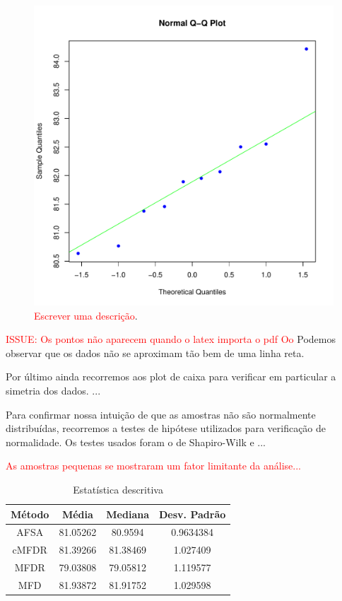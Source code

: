 \documentclass[conference]{IEEEtran}
\begin{document}
\begin{figure}[h]
	\centering
	\includegraphics[width=\linewidth]{img/bluenorm_mfd.pdf}
	\caption{\textcolor{red}{Escrever uma descrição}.}
	\label{fig:hist_mfd}
\end{figure}

\textcolor{red}{ISSUE: Os pontos não aparecem quando o latex importa o pdf Oo}
Podemos observar que os dados não se aproximam tão bem de uma linha reta.

Por último ainda recorremos aos plot de caixa para verificar em particular a simetria dos dados. ...

Para confirmar nossa intuição de que as amostras não são normalmente distribuídas, recorremos a testes de hipótese utilizados para verificação de normalidade.
Os testes usados foram o de Shapiro-Wilk \cite{shapiro1965analysis} e ...	

\textcolor{red}{As amostras pequenas se mostraram um fator limitante da análise...}

\begin{table}[h]
	\centering
	\caption{Estatística descritiva}
	\label{tab:est_descr}
	\begin{tabular}{cccc}
		Método    & Média  & Mediana & Desv. Padrão  \\
		\hline
		AFSA&		81.05262 	& 80.9594 	& 0.9634384 \\
		cMFDR&      81.39266 	& 81.38469 	& 1.027409 \\
		MFDR& 		79.03808 	& 79.05812 	& 1.119577 \\
		MFD&     	81.93872 	& 81.91752 	& 1.029598 \\
		\hline
	\end{tabular}
\end{table}
\end{document}
